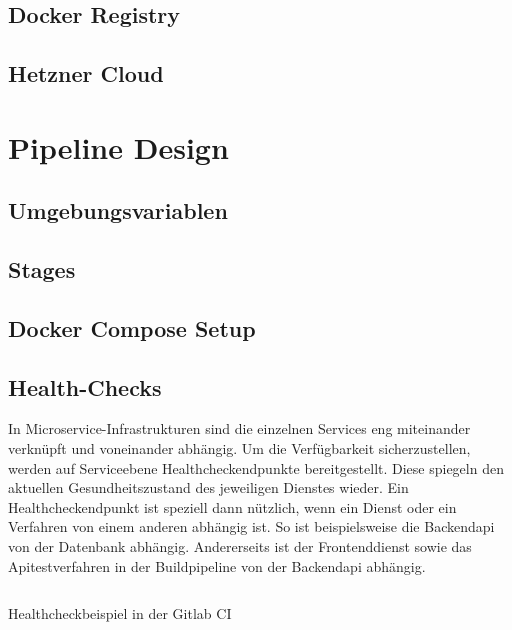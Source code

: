 \subsection{Docker Registry}
\label{subsec:dockerregistry}

\subsection{Hetzner Cloud}
\label{subsec:hetznercloud}

\section{Pipeline Design}
\label{sec:pipelinedesign}

\subsection{Umgebungsvariablen}
\label{subsec:umgebungsvariablen}

\subsection{Stages}
\label{subsec:stages}

\subsection{Docker Compose Setup}
\label{subsec:dockercomposesetup}

\subsection{Health-Checks}
\label{subsec:healthcheck}
In Microservice-Infrastrukturen sind die einzelnen Services eng miteinander verknüpft
und voneinander abhängig. Um die Verfügbarkeit sicherzustellen, werden auf
Serviceebene Healthcheckendpunkte bereitgestellt. Diese spiegeln den aktuellen
Gesundheitszustand des jeweiligen Dienstes wieder. Ein Healthcheckendpunkt
ist speziell dann nützlich, wenn ein Dienst oder ein Verfahren von einem anderen
abhängig ist. So ist beispielsweise die Backendapi von der Datenbank
abhängig. Andererseits ist der Frontenddienst sowie das Apitestverfahren
in der Buildpipeline von der Backendapi abhängig. 

\begin{listing}
    \label{lst:healthcheck}
    \inputminted{sh}{snippets/sh/healthcheck.sh}
    \caption{Healthcheckbeispiel in der Gitlab CI}
\end{listing}

